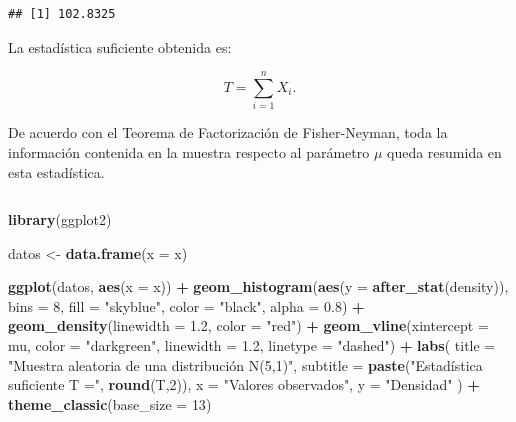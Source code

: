 \documentclass[
  11pt,
]{report}
\newenvironment{Shaded}{\begin{snugshade}}{\end{snugshade}}
\newcommand{\AttributeTok}[1]{\textcolor[rgb]{0.13,0.29,0.53}{#1}}
\newcommand{\DecValTok}[1]{\textcolor[rgb]{0.00,0.00,0.81}{#1}}
\newcommand{\FloatTok}[1]{\textcolor[rgb]{0.00,0.00,0.81}{#1}}
\newcommand{\FunctionTok}[1]{\textcolor[rgb]{0.13,0.29,0.53}{\textbf{#1}}}
\newcommand{\NormalTok}[1]{#1}
\newcommand{\OtherTok}[1]{\textcolor[rgb]{0.56,0.35,0.01}{#1}}
\newcommand{\SpecialCharTok}[1]{\textcolor[rgb]{0.81,0.36,0.00}{\textbf{#1}}}
\newcommand{\StringTok}[1]{\textcolor[rgb]{0.31,0.60,0.02}{#1}}
\begin{document}
\begin{verbatim}
## [1] 102.8325
\end{verbatim}

La estadística suficiente obtenida es:

\[T=\sum_{i=1}^{n}X_i.\]

De acuerdo con el Teorema de Factorización de Fisher-Neyman, toda la
información contenida en la muestra respecto al parámetro \(\mu\) queda
resumida en esta estadística.

\begin{verbatim}
\end{verbatim}

\begin{Shaded}
\begin{Highlighting}[]
\FunctionTok{library}\NormalTok{(ggplot2)}

\NormalTok{datos }\OtherTok{\textless{}{-}} \FunctionTok{data.frame}\NormalTok{(}\AttributeTok{x =}\NormalTok{ x)}

\FunctionTok{ggplot}\NormalTok{(datos, }\FunctionTok{aes}\NormalTok{(}\AttributeTok{x =}\NormalTok{ x)) }\SpecialCharTok{+}
  \FunctionTok{geom\_histogram}\NormalTok{(}\FunctionTok{aes}\NormalTok{(}\AttributeTok{y =} \FunctionTok{after\_stat}\NormalTok{(density)),}
                 \AttributeTok{bins =} \DecValTok{8}\NormalTok{,}
                 \AttributeTok{fill =} \StringTok{"skyblue"}\NormalTok{,}
                 \AttributeTok{color =} \StringTok{"black"}\NormalTok{,}
                 \AttributeTok{alpha =} \FloatTok{0.8}\NormalTok{) }\SpecialCharTok{+}
  \FunctionTok{geom\_density}\NormalTok{(}\AttributeTok{linewidth =} \FloatTok{1.2}\NormalTok{, }\AttributeTok{color =} \StringTok{"red"}\NormalTok{) }\SpecialCharTok{+}
  \FunctionTok{geom\_vline}\NormalTok{(}\AttributeTok{xintercept =}\NormalTok{ mu,}
             \AttributeTok{color =} \StringTok{"darkgreen"}\NormalTok{,}
             \AttributeTok{linewidth =} \FloatTok{1.2}\NormalTok{,}
             \AttributeTok{linetype =} \StringTok{"dashed"}\NormalTok{) }\SpecialCharTok{+}
  \FunctionTok{labs}\NormalTok{(}
    \AttributeTok{title =} \StringTok{"Muestra aleatoria de una distribución N(5,1)"}\NormalTok{,}
    \AttributeTok{subtitle =} \FunctionTok{paste}\NormalTok{(}\StringTok{"Estadística suficiente T ="}\NormalTok{, }\FunctionTok{round}\NormalTok{(T,}\DecValTok{2}\NormalTok{)),}
    \AttributeTok{x =} \StringTok{"Valores observados"}\NormalTok{,}
    \AttributeTok{y =} \StringTok{"Densidad"}
\NormalTok{  ) }\SpecialCharTok{+}
  \FunctionTok{theme\_classic}\NormalTok{(}\AttributeTok{base\_size =} \DecValTok{13}\NormalTok{)}
\end{Highlighting}
\end{Shaded}
\end{document}
